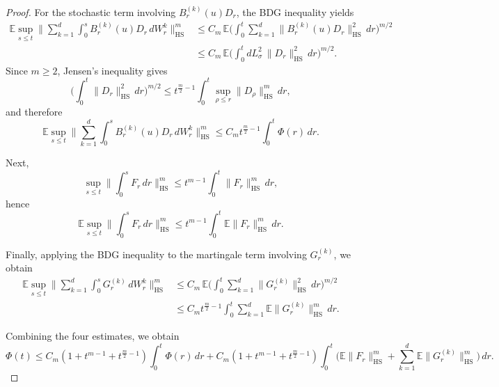\documentclass{tsp-short}
\theoremstyle{remark}
\theoremstyle{definition}
\begin{document}
\begin{proof}
For the stochastic term involving \(B_r^{(k)}(u)D_r\), the BDG inequality yields
\begin{align*}
\mathbb{E}\sup_{s\le t}\Big\|\sum_{k=1}^d \int_0^s B_r^{(k)}(u)D_r\,dW_r^k\Big\|_{\mathrm{HS}}^m
&\le
C_m\,
\mathbb{E}\Big(\int_0^t \sum_{k=1}^d \|B_r^{(k)}(u)D_r\|_{\mathrm{HS}}^2\,dr\Big)^{m/2} \\
&\le
C_m\,
\mathbb{E}\Big(\int_0^t dL_\sigma^2\,\|D_r\|_{\mathrm{HS}}^2\,dr\Big)^{m/2}.
\end{align*}
Since \(m\ge2\), Jensen's inequality gives
\[
\Big(\int_0^t \|D_r\|_{\mathrm{HS}}^2\,dr\Big)^{m/2}
\le
t^{\frac m2-1}\int_0^t \sup_{\rho\le r}\|D_\rho\|_{\mathrm{HS}}^m\,dr,
\]
and therefore
\[
\mathbb{E}\sup_{s\le t}\Big\|\sum_{k=1}^d \int_0^s B_r^{(k)}(u)D_r\,dW_r^k\Big\|_{\mathrm{HS}}^m
\le
C_m t^{\frac m2-1}\int_0^t \Phi(r)\,dr.
\]

Next,
\[
\sup_{s\le t}\Big\|\int_0^s F_r\,dr\Big\|_{\mathrm{HS}}^m
\le
t^{m-1}\int_0^t \|F_r\|_{\mathrm{HS}}^m\,dr,
\]
hence
\[
\mathbb{E}\sup_{s\le t}\Big\|\int_0^s F_r\,dr\Big\|_{\mathrm{HS}}^m
\le
t^{m-1}\int_0^t \mathbb{E}\|F_r\|_{\mathrm{HS}}^m\,dr.
\]

Finally, applying the BDG inequality to the martingale term involving \(G_r^{(k)}\), we obtain
\begin{align*}
\mathbb{E}\sup_{s\le t}\Big\|\sum_{k=1}^d \int_0^s G_r^{(k)}\,dW_r^k\Big\|_{\mathrm{HS}}^m
&\le
C_m\,
\mathbb{E}\Big(\int_0^t \sum_{k=1}^d \|G_r^{(k)}\|_{\mathrm{HS}}^2\,dr\Big)^{m/2} \\
&\le
C_m t^{\frac m2-1}\int_0^t \sum_{k=1}^d \mathbb{E}\|G_r^{(k)}\|_{\mathrm{HS}}^m\,dr.
\end{align*}

Combining the four estimates, we obtain
\begin{equation}\label{eq:gronwall-ineq-fullproof}
\Phi(t)
\le
C_m(1+t^{m-1}+t^{\frac m2-1})\int_0^t \Phi(r)\,dr
+
C_m(1+t^{m-1}+t^{\frac m2-1})\int_0^t
\Big(
\mathbb{E}\|F_r\|_{\mathrm{HS}}^m
+
\sum_{k=1}^d \mathbb{E}\|G_r^{(k)}\|_{\mathrm{HS}}^m
\Big)\,dr.
\end{equation}


\end{proof}
\end{document}
